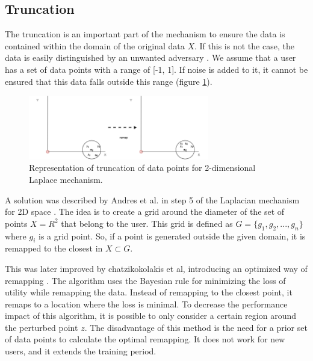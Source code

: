 \subsection{Truncation} \label{theory:truncation}
The truncation is an important part of the mechanism to ensure the data is contained within the domain of the original data $X$.
If this is not the case, the data is easily distinguished by an unwanted adversary \citep{DBLP:journals/corr/abs-1212-1984,9646489}.
We assume that a user has a set of data points with a range of [-1, 1].
If noise is added to it, it cannot be ensured that this data falls outside this range (figure \ref{figure:truncation-2d}).
\begin{figure}[ht]
  \includegraphics[width=0.7\textwidth]{TheorethicalFramework/ND-Laplace/Images/remapping.png}
  \caption{Representation of truncation of data points for 2-dimensional Laplace mechanism.}
  \label{figure:truncation-2d}
\end{figure}

A solution was described by Andres et al. in step 5 of the Laplacian mechanism for 2D space \citep{DBLP:journals/corr/abs-1212-1984}.
The idea is to create a grid around the diameter of the set of points $X = R^2$ that belong to the user.
This grid is defined as $G = \{g_1, g_2, ..., g_n\}$ where $g_i$ is a grid point.
So, if a point is generated outside the given domain, it is remapped to the closest in $X \subset G$.

This was later improved by chatzikokolakis et al, introducing an optimized way of remapping \citep{chatzikokolakis_efficient_2017}.
The algorithm uses the Bayesian rule for minimizing the loss of utility while remapping the data.
Instead of remapping to the closest point, it remaps to a location where the loss is minimal.
To decrease the performance impact of this algorithm, it is possible to only consider a certain region around the perturbed point $z$.
The disadvantage of this method is the need for a prior set of data points to calculate the optimal remapping.
It does not work for new users, and it extends the training period.

